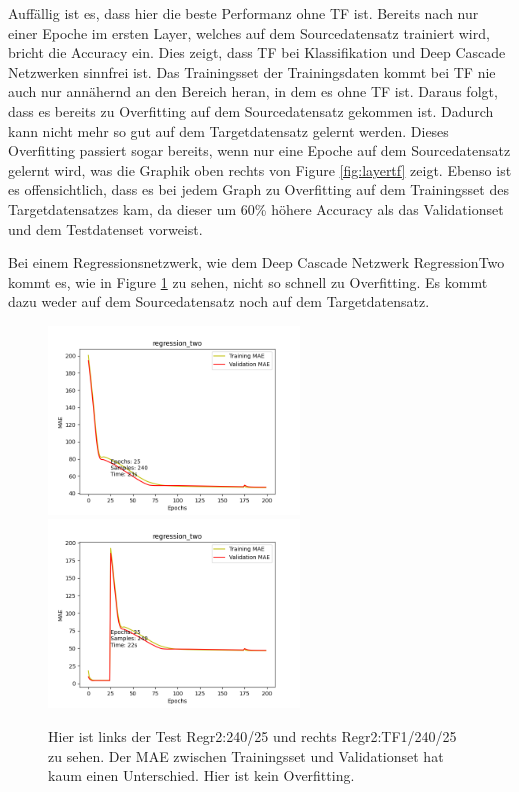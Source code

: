Auffällig ist es, dass hier die beste Performanz ohne TF ist. Bereits nach nur einer Epoche im ersten Layer, welches auf dem Sourcedatensatz 
trainiert wird, bricht die Accuracy ein. Dies zeigt, dass TF bei Klassifikation und Deep Cascade Netzwerken sinnfrei ist. Das 
Trainingsset der Trainingsdaten kommt bei TF nie auch nur annähernd an den Bereich heran, in dem es ohne TF ist. Daraus folgt, dass es 
bereits zu Overfitting auf dem Sourcedatensatz gekommen ist. Dadurch kann nicht mehr so gut auf dem Targetdatensatz gelernt werden. Dieses 
Overfitting passiert sogar bereits, wenn nur eine Epoche auf dem Sourcedatensatz gelernt wird, was die Graphik oben rechts von Figure \ref{fig:layertf} zeigt. 
Ebenso ist es offensichtlich, dass es bei jedem Graph zu Overfitting auf dem Trainingsset des Targetdatensatzes kam, da dieser um 60\% höhere 
Accuracy als das Validationset und dem Testdatenset vorweist. 

Bei einem Regressionsnetzwerk, wie dem Deep Cascade Netzwerk RegressionTwo kommt es, wie in Figure \ref{fig:regr2tf} zu sehen, nicht so schnell zu Overfitting. 
Es kommt dazu weder auf dem Sourcedatensatz noch auf dem Targetdatensatz. 

\begin{figure}[htpb]
    \includegraphics[height=5cm]{../../Plots/ba_plots/regr2/woregr2tr.png}
    \includegraphics[height=5cm]{../../Plots/ba_plots/regr2/1TFtr.png}
    \caption{\label{fig:regr2tf} 
    \small{Hier ist links der Test Regr2:240/25 und rechts Regr2:TF1/240/25 zu sehen. Der MAE zwischen Trainingsset und Validationset hat kaum 
    einen Unterschied. Hier ist kein Overfitting.}}
\end{figure}

